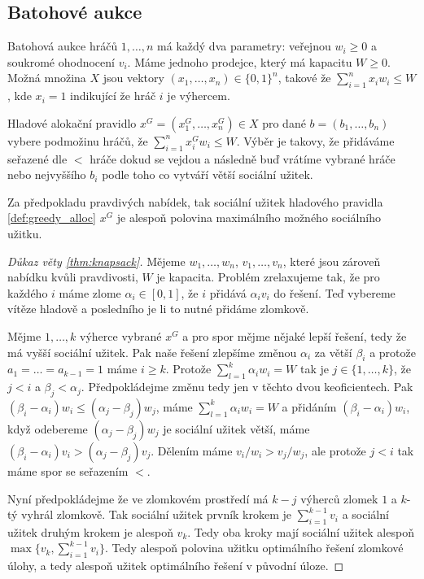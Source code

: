 \subsection{Batohové aukce}
\begin{definition}
\label{def:knapsack}
  Batohová aukce hráčů $1,\dots,n$ má každý dva parametry: veřejnou $w_i \geq 0$ a soukromé ohodnocení $v_i$. 
  Máme jednoho prodejce, který má kapacitu $W \geq 0$. 
  Možná množina $X$ jsou vektory $(x_1,\dots,x_n) \in \{0,1\}^n$, takové že $\sum_{i=1}^n x_iw_i \leq W$, kde $x_i = 1$ indikující že hráč $i$ je výhercem. 
\end{definition}
\begin{definition}
\label{def:greedy_alloc}
    Hladové alokační pravidlo $x^G = (x_1^G, \dots, x_n^G) \in X$ pro dané $b = (b_1,\dots,b_n)$ vybere podmožinu hráčů, že $\sum_{i=1}^n x^G_i w_i \leq W$. 
    Výběr je takovy, že přidáváme seřazené dle $<$ hráče dokud se vejdou a následně buď vrátíme vybrané hráče nebo nejvyššího $b_i$ podle toho co vytváří větší sociální užitek. 
\end{definition}

\begin{theorem}
\label{thm:knapsack}
    Za předpokladu pravdivých nabídek, tak sociální užitek hladového pravidla \ref{def:greedy_alloc} $x^G$ je alespoň polovina maximálního možného sociálního užitku. 
\end{theorem}
\begin{proof}[Důkaz věty \ref{thm:knapsack}]
   Mějeme $w_1,\dots, w_n$, $v_1,\dots,v_n$, které jsou zároveň nabídku kvůli pravdivosti, $W$ je kapacita. 
   Problém zrelaxujeme tak, že pro každého $i$ máme zlome $\alpha_i \in [0,1]$, že $i$ přidává $\alpha_iv_i$ do řešení. 
   Teď vybereme vítěze hladově a posledního je li to nutné přidáme zlomkově. 

   Mějme $1,\dots,k$ výherce vybrané $x^G$ a pro spor mějme nějaké lepší řešení, tedy že má vyšší sociální užitek. 
   Pak naše řešení zlepšíme změnou $\alpha_i$ za větší $\beta_i$ a protože $a_1=\dots=a_{k-1} = 1$ máme $i \geq k$. 
   Protože $\sum^k_{l=1} \alpha_i w_i = W$ tak je $j\in \{1,\dots,k\}$, že $j<i$ a $\beta_j < \alpha_j$. 
   Předpokládejme změnu tedy jen v těchto dvou keoficientech. 
   Pak $(\beta_i-\alpha_i)w_i \leq (\alpha_j-\beta_j)w_j$, máme $\sum^k_{l=1} \alpha_i w_i = W$ a přidáním $(\beta_i-\alpha_i)w_i$, když odebereme $(\alpha_j-\beta_j)w_j$ je sociální užitek větší, máme $(\beta_i-\alpha_i)v_i > (\alpha_j-\beta_j)v_j$. 
   Dělením máme $v_i/w_i > v_j/w_j$, ale protože $j<i$ tak máme spor se seřazením $<$. 

   Nyní předpokládejme že ve zlomkovém prostředí má $k-j$ výherců zlomek $1$ a $k$-tý vyhrál zlomkově. 
   Tak sociální užitek prvník krokem je $\sum^{k-1}_{i=1} v_i$ a sociální užitek druhým krokem je alespoň $v_k$. 
   Tedy oba kroky mají sociální užitek alespoň $\max\{v_k, \sum^{k-1}_{i=1} v_i\}$. 
   Tedy alespoň polovina užitku optimálního řešení zlomkové úlohy, a tedy alespoň užitek optimálního řešení v původní úloze. 
\end{proof}

